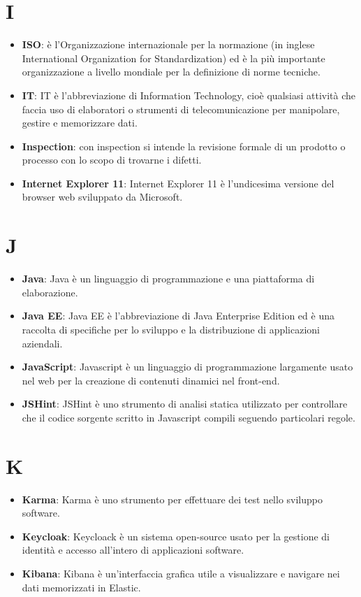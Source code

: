\documentclass[a4paper, oneside, openany]{article}
\begin{document}
\section{I}
\begin{itemize}
\item \textbf{ISO}: è l'Organizzazione internazionale per la normazione (in inglese International Organization for Standardization) ed è la più importante organizzazione a livello mondiale per la definizione di norme tecniche.
\item \textbf{IT}: IT è l'abbreviazione di Information Technology, cioè qualsiasi attività che faccia uso di elaboratori o strumenti di telecomunicazione per manipolare, gestire e memorizzare dati.
\item \textbf{Inspection}:  con inspection si intende la revisione formale di un prodotto o processo con lo scopo di trovarne i difetti.
\item \textbf{Internet Explorer 11}: Internet Explorer 11 è l'undicesima versione del browser web sviluppato da Microsoft.

\end{itemize}

\section{J}
\begin{itemize}
\item \textbf{Java}: Java è un linguaggio di programmazione e una piattaforma di elaborazione.
\item \textbf{Java EE}: Java EE è l'abbreviazione di Java Enterprise Edition ed è una raccolta di specifiche per lo sviluppo e la distribuzione di applicazioni aziendali.	
\item \textbf{JavaScript}: Javascript è un linguaggio di programmazione largamente usato nel web per la creazione di contenuti dinamici nel front-end. 
\item \textbf{JSHint}: JSHint è uno strumento di analisi statica utilizzato per controllare che il codice sorgente scritto in Javascript compili seguendo particolari regole.
\end{itemize}

\section{K}
\begin{itemize}
\item \textbf{Karma}: Karma è uno strumento per effettuare dei test nello sviluppo software. 
\item \textbf{Keycloak}: Keycloack è un sistema open-source usato per la gestione di identità e accesso all'intero di applicazioni software.
\item \textbf{Kibana}: Kibana è un'interfaccia grafica utile a visualizzare e navigare nei dati memorizzati in Elastic.
\end{itemize}
\end{document}
